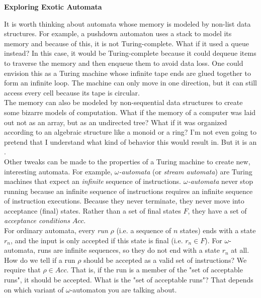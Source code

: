 \begin{tcolorbox}[breakable, enhanced, colback=textbook-blue, sharp corners]
	\vspace{2mm}
	\begin{center}
		\textbf{Exploring Exotic Automata}
	\end{center}
	\vspace{1mm}
	It is worth thinking about automata whose memory is modeled by non-list data structures. For example, a pushdown automaton uses a stack to model its memory and because of this, it is not Turing-complete. What if it used a queue instead? In this case, it would be Turing-complete because it could dequeue items to traverse the memory and then enqueue them to avoid data loss. One could envision this as a Turing machine whose infinite tape ends are glued together to form an infinite loop. The machine can only move in one direction, but it can still access every cell because its tape is circular. \\
	
	The memory can also be modeled by non-sequential data structures to create some bizarre models of computation. What if the memory of a computer was laid out not as an array, but as an undirected tree? What if it was organized according to an algebraic structure like a monoid or a ring? I'm not even going to pretend that I understand what kind of behavior this would result in. But it is an . \\
	
	Other tweaks can be made to the properties of a Turing machine to create new, interesting automata. For example, \textit{$\omega$-automata} (or \textit{stream automata}) are Turing machines that expect an \textit{infinite} sequence of instructions. \textit{$\omega$-automata} never stop running because an infinite sequence of instructions requires an infinite sequence of instruction executions. Because they never terminate, they never move into acceptance (final) states. Rather than a set of final states $F$, they have a set of \textit{acceptance conditions} $Acc$. \\
	
	For ordinary automata, every \textit{run} $\rho$ (i.e. a sequence of $n$ states) ends with a state $r_n$, and the input is only accepted if this state is final (i.e. $r_n\in F$). For $\omega$-automata, runs are infinite sequences, so they do not end with a state $r_n$ at all. How do we tell if a run $\rho$ should be accepted as a valid set of instructions? We require that $\rho\in Acc$. That is, if the run is a member of the "set of acceptable runs", it should be accepted. What is the "set of acceptable runs"? That depends on which variant of $\omega$-automaton you are talking about. \\
	

\end{tcolorbox}
